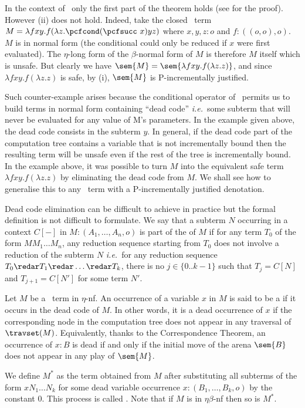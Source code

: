 In the context of \pcf\, only the first part of the theorem holds (see \cite{blumtransfer} for the proof). However (ii) does not hold. Indeed, take the closed \pcf\ term $M = \lambda f x y. f (\lambda z. \pcfcond (\pcfsucc\ x) y z )$ where $x,y,z:o$ and $f:((o,o),o)$. $M$ is in normal form (the conditional  could  only be reduced if $x$ were first evaluated). The $\eta$-long form of the $\beta$-normal form of $M$ is therefore $M$ itself which is unsafe.
But clearly we have $\sem{M} = \sem{\lambda f x y. f (\lambda z. z)}$, and since  $\lambda f x y. f (\lambda z. z)$ is safe, by (i), $\sem{M}$ is P-incrementally justified.

Such counter-example arises because the conditional operator of \pcf\ permits us to build terms in normal form containing ``dead code'' {\it i.e.}~some subterm that will never be evaluated for any value of M's parameters. In the example given above, the dead code consists in the subterm $y$. In general, if the dead code part of the computation tree contains a variable that is not incrementally bound then the resulting term will be unsafe even if the rest of the tree is incrementally bound.
In the example above, it was possible to turn $M$ into the equivalent safe term $\lambda f x y. f (\lambda z. z)$ by eliminating the dead code from $M$.
We shall see how to generalise this to any \pcf\ term with a P-incrementally justified denotation.

Dead code elimination can be difficult to achieve in practice but the formal definition is not difficult to formulate. We say that a subterm $N$ occurring
in a context $C[-]$ in $M : (A_1, \ldots, A_n,o)$ is part of the  of $M$ if for any term $T_0$ of the form $M M_1 \ldots M_n$,
any reduction sequence starting from $T_0$ does not involve a reduction of the subterm $N$ {\it i.e.}~for any reduction sequence $T_0 \redar T_1 \redar \ldots \redar T_k$, there is no $j\in \{0.. k-1\}$ such that $T_j = C[N]$ and $T_{j+1} = C[N']$ for some term $N'$.


Let $M$  be a \pcf\ term in $\eta$-nf.
An occurrence of a variable $x$ in $M$ is said to be a 
if it occurs in the dead code of $M$. In other words, it is a
dead occurrence of $x$ if the corresponding node in the computation tree does not appear in any traversal of $\travset(M)$. Equivalently, thanks to the Correspondence Theorem, an occurrence of $x:B$ is dead if and only if the initial move
of the arena $\sem{B}$ does not appear in any play of $\sem{M}$.


We define $M^*$ as the term obtained from $M$ after substituting all subterms of the form  $x N_1 \dots N_k$ for some dead variable occurrence $x:(B_1,\ldots, B_k, o)$ by the constant $0$. This process is called .
Note that if $M$ is in $\eta\beta$-nf then so is $M^*$.

